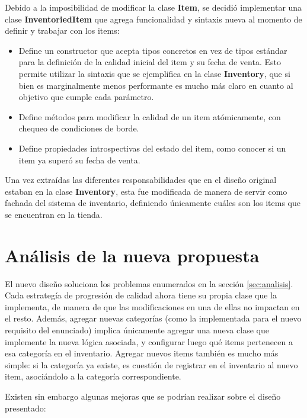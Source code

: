 \documentclass[a4paper,11pt]{article}
\begin{document}
Debido a la imposibilidad de modificar la clase \textbf{Item}, se decidió
implementar una clase \textbf{InventoriedItem} que agrega funcionalidad y
sintaxis nueva al momento de definir y trabajar con los items:

\begin{itemize}

  \item Define un constructor que acepta tipos concretos en vez de tipos
    estándar para la definición de la calidad inicial del item y su fecha de
    venta. Esto permite utilizar la sintaxis que se ejemplifica en la clase
    \textbf{Inventory}, que si bien es marginalmente menos performante es mucho
    más claro en cuanto al objetivo que cumple cada parámetro.

  \item Define métodos para modificar la calidad de un item atómicamente, con
    chequeo de condiciones de borde.

  \item Define propiedades introspectivas del estado del item, como conocer si
    un item ya superó su fecha de venta.

\end{itemize}

Una vez extraídas las diferentes responsabilidades que en el diseño original
estaban en la clase \textbf{Inventory}, esta fue modificada de manera de servir
como fachada del sistema de inventario, definiendo únicamente cuáles son los
items que se encuentran en la tienda.

\section{Análisis de la nueva propuesta}

El nuevo diseño soluciona los problemas enumerados en la sección
\ref{sec:analisis}. Cada estrategía de progresión de calidad ahora tiene su
propia clase que la implementa, de manera de que las modificaciones en una de
ellas no impactan en el resto. Además, agregar nuevas categorías (como la
implementada para el nuevo requisito del enunciado) implica únicamente agregar
una nueva clase que implemente la nueva lógica asociada, y configurar luego qué
items pertenecen a esa categoría en el inventario. Agregar nuevos items también
es mucho más simple: si la categoría ya existe, es cuestión de registrar en el
inventario al nuevo item, asociándolo a la categoría correspondiente.

Existen sin embargo algunas mejoras que se podrían realizar sobre el diseño
presentado:
\end{document}
